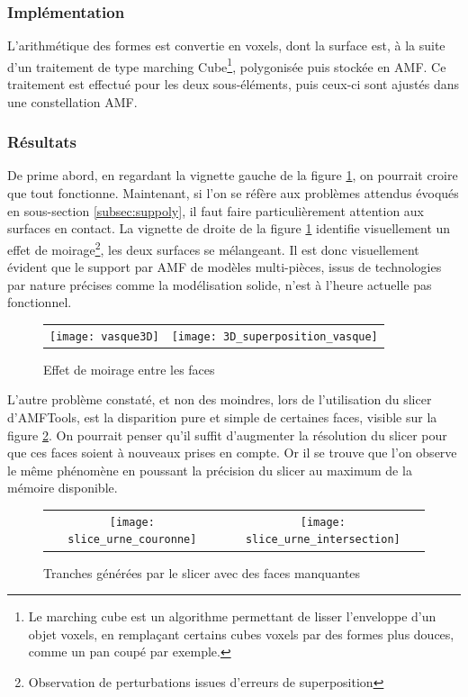 \documentclass{tnreport}
\begin{document}
\subsubsection{Implémentation}
L'arithmétique des formes est convertie en voxels, dont la surface est, à la suite d'un traitement de type marching Cube\footnote{Le marching cube est un algorithme permettant de lisser l'enveloppe d'un objet voxels, en remplaçant certains cubes voxels par des formes plus douces, comme un pan coupé par exemple.}, polygonisée puis stockée en AMF. Ce traitement est effectué pour les deux sous-éléments, puis ceux-ci sont ajustés dans une constellation AMF. 

\subsubsection{Résultats}
De prime abord, en regardant la vignette gauche de la figure \ref{fig:resvasque}, on pourrait croire que tout fonctionne. Maintenant, si l'on se réfère aux problèmes attendus évoqués en sous-section \ref{subsec:suppoly}, il faut faire particulièrement attention aux surfaces en contact. La vignette de droite de la figure \ref{fig:resvasque} identifie visuellement un effet de moirage\footnote{Observation de perturbations issues d'erreurs de superposition}, les deux surfaces se mélangeant. Il est donc visuellement évident que le support par AMF de modèles multi-pièces, issus de technologies par nature précises comme la modélisation solide, n'est à l'heure actuelle pas fonctionnel. 
\begin{figure}[htb]
\centering
\begin{tabular}{@{}cc@{}}
\texttt{[image: vasque3D]} &
\texttt{[image: 3D\_superposition\_vasque]}
\end{tabular}
\label{fig:resvasque}
\caption{Effet de moirage entre les faces}
\end{figure}

L'autre problème constaté, et non des moindres, lors de l'utilisation du slicer d'AMFTools, est la disparition pure et simple de certaines faces, visible sur la figure \ref{fig:sliceurne}. On pourrait penser qu'il suffit d'augmenter la résolution du slicer pour que ces faces soient à nouveaux prises en compte. Or il se trouve que l'on observe le même phénomène en poussant la précision du slicer au maximum de la mémoire disponible. 
\begin{figure}[htb]
\centering
  \begin{tabular}{@{}cc@{}}
    \texttt{[image: slice\_urne\_couronne]} &
    \texttt{[image: slice\_urne\_intersection]}
  \end{tabular}
  \caption{Tranches générées par le slicer avec des faces manquantes}
  \label{fig:sliceurne}
\end{figure}
\end{document}
